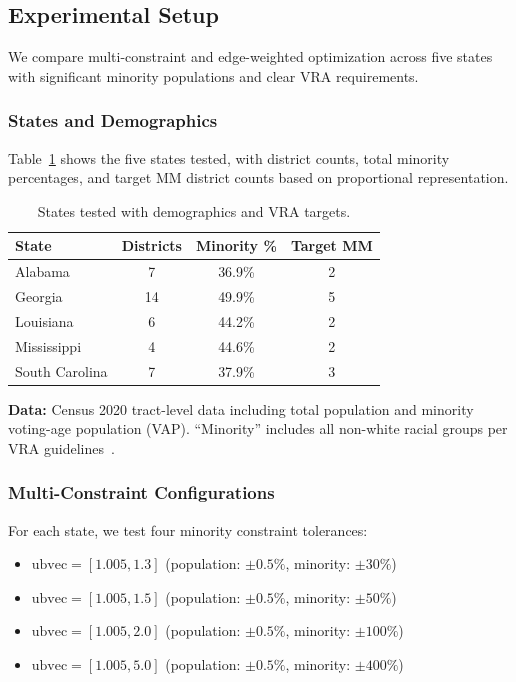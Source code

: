 \label{sec:experiments}

\subsection{Experimental Setup}

We compare multi-constraint and edge-weighted optimization across five states with significant minority populations and clear VRA requirements.

\subsubsection{States and Demographics}

Table~\ref{tab:states} shows the five states tested, with district counts, total minority percentages, and target MM district counts based on proportional representation.

\begin{table}[h]
\centering
\caption{States tested with demographics and VRA targets.}
\label{tab:states}
\small
\begin{tabular}{lccc}
\toprule
\textbf{State} & \textbf{Districts} & \textbf{Minority \%} & \textbf{Target MM} \\
\midrule
Alabama & 7 & 36.9\% & 2 \\
Georgia & 14 & 49.9\% & 5 \\
Louisiana & 6 & 44.2\% & 2 \\
Mississippi & 4 & 44.6\% & 2 \\
South Carolina & 7 & 37.9\% & 3 \\
\bottomrule
\end{tabular}
\end{table}

\textbf{Data:} Census 2020 tract-level data including total population and minority voting-age population (VAP). ``Minority'' includes all non-white racial groups per VRA guidelines~\cite{ada1982}.

\subsubsection{Multi-Constraint Configurations}

For each state, we test four minority constraint tolerances:
\begin{itemize}
    \item $\text{ubvec} = [1.005, 1.3]$ (population: $\pm0.5\%$, minority: $\pm30\%$)
    \item $\text{ubvec} = [1.005, 1.5]$ (population: $\pm0.5\%$, minority: $\pm50\%$)
    \item $\text{ubvec} = [1.005, 2.0]$ (population: $\pm0.5\%$, minority: $\pm100\%$)
    \item $\text{ubvec} = [1.005, 5.0]$ (population: $\pm0.5\%$, minority: $\pm400\%$)
\end{itemize}

